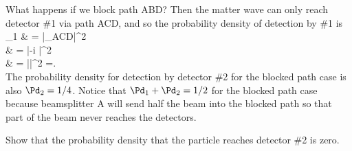 What happens if we block path ABD?  Then the matter wave can only reach detector \#1 via path ACD,  and so the probability density of detection by \#1 is
%
\bas
\Pd_{1} & = \left|\psi_{ACD}\right|^{2} \nonumber \\
	& = \left|-i \right|^{2}\nonumber \\
	& =  \left|\right|^{2} =.\\
	\eas
%
The probability density for detection by detector \#2 for the blocked path case is also $\Pd_{2} = 1/4$.   Notice that $\Pd_{1} + \Pd_{2} = 1/2$ for the blocked path case because beamsplitter A will send half the beam into the blocked path so that part of the beam never reaches the detectors.  

\begin{exercise}
Show that the probability density that the particle reaches detector \#2 is zero.
\end{exercise}

